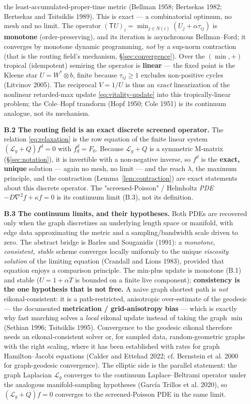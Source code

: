 \documentclass[11pt]{article}
\theoremstyle{plain}
\numberwithin{equation}{section}
\begin{document}
the least-accumulated-proper-time metric (Bellman 1958; Bertsekas 1982; Bertsekas and Tsitsiklis 1989). This is exact — a combinatorial optimum, no mesh and no limit. The operator $(\mathsf T U)_i=\min_{j\in N(i)}(U_j+\alpha\tau_{ij})$ is \textbf{monotone} (order-preserving), and its iteration is asynchronous Bellman–Ford; it converges by monotone dynamic programming, \emph{not} by a sup-norm contraction (that is the routing field's mechanism, §\ref{sec:convergence}). Over the $(\min,+)$ tropical (idempotent) semiring the operator is \textbf{linear} — the fixed point is the Kleene star $U=W^{*}\!\otimes b$, finite because $\tau_{ij}\ge 1$ excludes non-positive cycles (Litvinov 2005). The reciprocal $V=1/U$ is thus an \emph{exact} linearization of the nonlinear retarded-max update \eqref{eq:vitality-update} into this tropically-linear problem; the Cole–Hopf transform (Hopf 1950; Cole 1951) is its continuum analogue, not its mechanism.

\textbf{B.2 The routing field is an exact discrete screened operator.} The relation \eqref{eq:relaxation} is the row equation of the finite linear system $(\mathcal{L}_g+Q)f^d=0$ with $f^d_d=F_0$. Because $\mathcal{L}_g+Q$ is a symmetric M-matrix (§\ref{sec:notation}), it is invertible with a non-negative inverse, so $f^d$ is the \textbf{exact, unique} solution — again no mesh, no limit — and the reach $\lambda$, the maximum principle, and the contraction (Lemma~\ref{lem:contraction}) are exact statements about this discrete operator. The "screened-Poisson" / Helmholtz \emph{PDE} $-D\nabla^2 f+\kappa f=0$ is its continuum limit (B.3), not its definition.

\textbf{B.3 The continuum limits, and their hypotheses.} Both PDEs are recovered only when the graph discretizes an underlying length space or manifold, with edge data approximating the metric and a sampling/bandwidth scale driven to zero. The abstract bridge is Barles and Souganidis (1991): a \emph{monotone, consistent, stable} scheme converges locally uniformly to the unique \emph{viscosity solution} of the limiting equation (Crandall and Lions 1983), provided that equation enjoys a comparison principle. The min-plus update is monotone (B.1) and stable ($U=1+\alpha T$ is bounded on a finite live component); \textbf{consistency is the one hypothesis that is not free.} A naive graph shortest path is \emph{not} eikonal-consistent: it is a path-restricted, anisotropic over-estimate of the geodesic — the documented \textbf{metrication / grid-anisotropy bias} — which is exactly why fast marching solves a \emph{local} eikonal update instead of taking the graph $\min$ (Sethian 1996; Tsitsiklis 1995). Convergence to the geodesic eikonal therefore needs an eikonal-consistent solver or, for sampled data, random-geometric graphs with the right scaling, where it has been established with rates for graph Hamilton–Jacobi equations (Calder and Ettehad 2022; cf. Bernstein et al. 2000 for graph-geodesic convergence). The elliptic side is the parallel statement: the graph Laplacian $\mathcal{L}_g$ converges to the continuum Laplace–Beltrami operator under the analogous manifold-sampling hypotheses (García Trillos et al. 2020), so $(\mathcal{L}_g+Q)f=0$ converges to the screened-Poisson PDE in the same limit.
\end{document}
